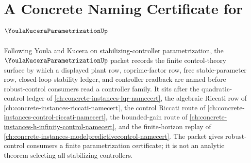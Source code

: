 \chapter{A Concrete Naming Certificate for $\YoulaKuceraParametrizationUp$}
\label{ch:concrete-instances-youla-kucera-parametrization-namecert}

Following Youla and Kucera on stabilizing-controller parametrization, the $\YoulaKuceraParametrizationUp$ packet records the finite control-theory surface by which a displayed plant row, coprime-factor row, free stable-parameter row, closed-loop stability ledger, and controller readback are named before robust-control consumers read a controller family. It sits after the quadratic-control ledger of \autoref{ch:concrete-instances-lqr-namecert}, the algebraic Riccati row of \autoref{ch:concrete-instances-riccati-namecert}, the control Riccati route of \autoref{ch:concrete-instances-control-riccati-namecert}, the bounded-gain route of \autoref{ch:concrete-instances-h-infinity-control-namecert}, and the finite-horizon replay of \autoref{ch:concrete-instances-modelpredictivecontrol-namecert}. The packet gives robust-control consumers a finite parametrization certificate; it is not an analytic theorem selecting all stabilizing controllers.

